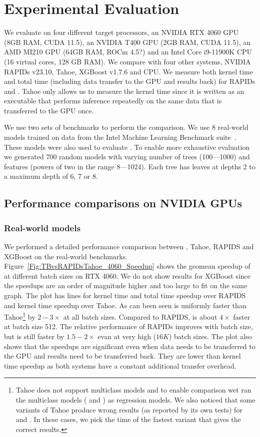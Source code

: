 \section{Experimental Evaluation}
\label{sec:results}

We evaluate \Treebeard{} on four different target processors, an NVIDIA RTX 4060 GPU (8GB RAM, CUDA 11.5),
an NVIDIA T400 GPU (2GB RAM, CUDA 11.5), an AMD MI210 GPU (64GB RAM, ROCm 4.5?) and an 
Intel Core i9-11900K CPU (16 virtual cores, 128 GB RAM). We compare \Treebeard{} with 
four other systems, NVIDIA RAPIDs v23.10, Tahoe, XGBoost v1.7.6 and \TreebeardOLD{} CPU. 
We measure both kernel time and total time (including data transfer to the GPU and results back) 
for RAPIDs and \Treebeard{}. Tahoe only allows us to measure the kernel time since it is written
as an executable that performs inference repeatedly on the same data that is transferred to the GPU once.

We use two sets of benchmarks to perform the comparison.
We use 8 real-world models trained on data from the Intel Machine 
Learning Benchmark suite~\cite{MLBenchmarks}. These models were also
used to evaluate \TreebeardOLD{}\cite{Treebeard}.
To enable more exhaustive evaluation we generated 700 random models with
varying number of trees (100---1000) and features (powers of two in the range 8---1024). 
Each tree has leaves at depths 2 to a maximum depth of 6, 7 or 8. 

\subsection{Performance comparisons on NVIDIA GPUs}
\subsubsection*{Real-world models}
We performed a detailed performance comparison between \Treebeard{}, Tahoe, RAPIDS and XGBoost on the real-world benchmarks.
Figure~\ref{Fig:TBvsRAPIDsTahoe_4060_Speedup} shows the geomean speedup of \Treebeard{} at different batch sizes on RTX 4060. 
We do not show results for XGBoost since the speedups are an order of magnitude higher and too large to fit on the same graph.  
  The plot has lines for kernel time and total time speedup over RAPIDS and kernel time speedup over Tahoe. As can been seen \Treebeard{} is uniformly faster than Tahoe{\footnote{Tahoe does not support multiclass models and to enable comparison wet ran the multiclass models ( and ) as regression models. We also noticed that some variants of Tahoe produce wrong results (as reported by its own tests) for 
   and . In these cases, we pick the time of the fastest variant that gives the correct results.
}} by $2-3\times$ at all batch sizes. 
Compared to RAPIDS, \Treebeard{} is about $4\times$ faster at batch size 512. The relative performance of RAPIDs improves with batch size, but \Treebeard{} is still faster by $1.5-2\times$ evan at very high ($16K$) batch sizes. 
The plot also shows that the speedups are significant even when data needs to be transferred to the GPU and results need to be transferred back. They are lower than kernel time speedup as both systems have a constant additional transfer overhead.

